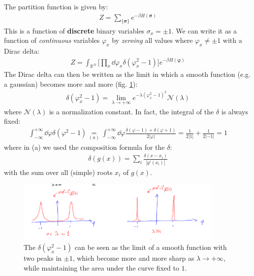 \documentclass[../../main.tex]{subfiles}
\begin{document}
\medskip

The partition function is given by:
\begin{align*}
    Z = \sum_{\{\bm{\sigma}\}} e^{-\beta H(\bm{\sigma})}
\end{align*}
This is a function of \textbf{discrete} binary variables $\sigma_x = \pm 1$. We can write it as a function of \textit{continuous} variables $\varphi_x$ by \textit{zeroing} all values where $\varphi_x \neq \pm 1$ with a Dirac delta:
\begin{align}\label{eqn:Z-delta}
    Z = \int_{\mathbb{R}^N} \Big[\prod_x \dd{\varphi_x} \delta(\varphi_x^2- 1)\Big] e^{-\beta H(\bm{\varphi})}
\end{align} 
The Dirac delta can then be written as the limit in which a smooth function (e.g. a gaussian) becomes more and more  (fig. \ref{fig:delta-peaks}):
\begin{align}\label{eqn:delta-limit}
    \delta(\varphi_x^2 - 1) = \lim_{\lambda \to +\infty} e^{- \lambda (\varphi_x^2 - 1)^2} \mathcal{N}(\lambda)
\end{align}
where $\mathcal{N}(\lambda)$ is a normalization constant. In fact, the integral of the $\delta$ is always fixed:
\begin{align}\label{eqn:delta-integral}
    \int_{-\infty}^{+\infty} \dd{\varphi} \delta(\varphi^2- 1) \underset{(a)}{=}  \int_{-\infty}^{+\infty} \dd{\varphi} \frac{\delta(\varphi-1) + \delta(\varphi+1)}{2|\varphi|} = \frac{1}{2|1|} + \frac{1}{2|-1|} = 1  
\end{align}
where in (a) we used the composition formula for the $\delta$:
\begin{align*}
    \delta(g(x)) = \sum_{i} \frac{\delta(x-x_i)}{|g'(x_i)|} 
\end{align*}
with the sum over all (simple) roots $x_i$ of $g(x)$.

\begin{figure}[H]
    \centering
    \includegraphics[width=0.9\textwidth]{delta-peaks.png}
    \caption{The $\delta(\varphi_x^2-1)$ can be seen as the limit of a smooth function with two peaks in $\pm 1$, which become more and more sharp as $\lambda \to +\infty$, while maintaining the area under the curve fixed to $1$.}
    \label{fig:delta-peaks}
\end{figure}
\end{document}
